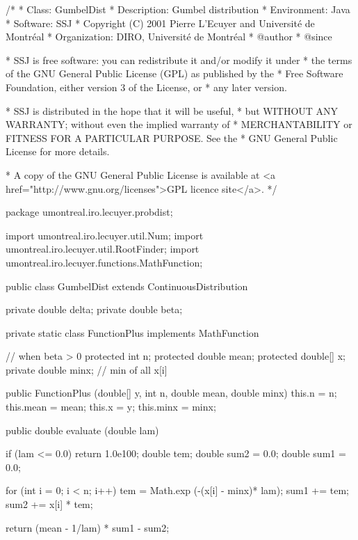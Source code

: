 \begin{code}
\begin{hide}
/*
 * Class:        GumbelDist
 * Description:  Gumbel distribution
 * Environment:  Java
 * Software:     SSJ 
 * Copyright (C) 2001  Pierre L'Ecuyer and Université de Montréal
 * Organization: DIRO, Université de Montréal
 * @author       
 * @since

 * SSJ is free software: you can redistribute it and/or modify it under
 * the terms of the GNU General Public License (GPL) as published by the
 * Free Software Foundation, either version 3 of the License, or
 * any later version.

 * SSJ is distributed in the hope that it will be useful,
 * but WITHOUT ANY WARRANTY; without even the implied warranty of
 * MERCHANTABILITY or FITNESS FOR A PARTICULAR PURPOSE.  See the
 * GNU General Public License for more details.

 * A copy of the GNU General Public License is available at
   <a href="http://www.gnu.org/licenses">GPL licence site</a>.
 */
\end{hide}
package umontreal.iro.lecuyer.probdist;
\begin{hide}
import umontreal.iro.lecuyer.util.Num;
import umontreal.iro.lecuyer.util.RootFinder;
import umontreal.iro.lecuyer.functions.MathFunction;
\end{hide}
public class GumbelDist extends ContinuousDistribution\begin{hide} {
   private double delta;
   private double beta;

   private static class FunctionPlus implements MathFunction {
      // when beta > 0
      protected int n;
      protected double mean;
      protected double[] x;
      private double minx;   // min of all {x[i]}

      public FunctionPlus (double[] y, int n, double mean, double minx) {
         this.n = n;
         this.mean = mean;
         this.x = y;
         this.minx = minx;
      }

      public double evaluate (double lam) {
         if (lam <= 0.0) return 1.0e100;
         double tem;
         double sum2 = 0.0;
         double sum1 = 0.0;

         for (int i = 0; i < n; i++) {
            tem = Math.exp (-(x[i] - minx)* lam);
            sum1 += tem;
            sum2 += x[i] * tem;
         }

         return (mean - 1/lam) * sum1 - sum2;
      }
   }


}
\end{hide}
\end{code}
